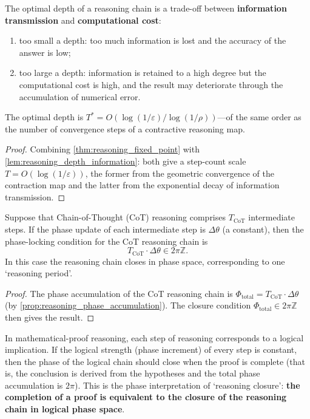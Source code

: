 \begin{corollary}\label{cor:optimal_reasoning_depth}
The optimal depth of a reasoning chain is a trade-off between \textbf{information transmission} and \textbf{computational cost}:
\begin{enumerate}[label=(\roman*)]
    \item too small a depth: too much information is lost and the accuracy of the answer is low;
    \item too large a depth: information is retained to a high degree but the computational cost is high, and the result may deteriorate through the accumulation of numerical error.
\end{enumerate}
The optimal depth is $T^*=O(\log(1/\varepsilon)/\log(1/\rho))$---of the same order as the number of convergence steps of a contractive reasoning map.
\end{corollary}

\begin{proof}
Combining \cref{thm:reasoning_fixed_point} with \cref{lem:reasoning_depth_information}: both give a step-count scale $T=O(\log(1/\varepsilon))$, the former from the geometric convergence of the contraction map and the latter from the exponential decay of information transmission.
\end{proof}

\begin{theorem}\label{thm:cot_phase_locking}
Suppose that Chain-of-Thought (CoT) reasoning comprises $T_{\text{CoT}}$ intermediate steps. If the phase update of each intermediate step is $\Delta\theta$ (a constant), then the phase-locking condition for the CoT reasoning chain is
\[
T_{\text{CoT}}\cdot\Delta\theta\in2\pi\mathbb{Z}.
\]
In this case the reasoning chain closes in phase space, corresponding to one `reasoning period'.
\end{theorem}

\begin{proof}
The phase accumulation of the CoT reasoning chain is $\Phi_{\text{total}}=T_{\text{CoT}}\cdot\Delta\theta$ (by \cref{prop:reasoning_phase_accumulation}). The closure condition $\Phi_{\text{total}}\in2\pi\mathbb{Z}$ then gives the result.
\end{proof}

\begin{example}\label{ex:math_proof_phase}
In mathematical-proof reasoning, each step of reasoning corresponds to a logical implication. If the logical strength (phase increment) of every step is constant, then the phase of the logical chain should close when the proof is complete (that is, the conclusion is derived from the hypotheses and the total phase accumulation is $2\pi$). This is the phase interpretation of `reasoning closure': \textbf{the completion of a proof is equivalent to the closure of the reasoning chain in logical phase space}.
\end{example}

